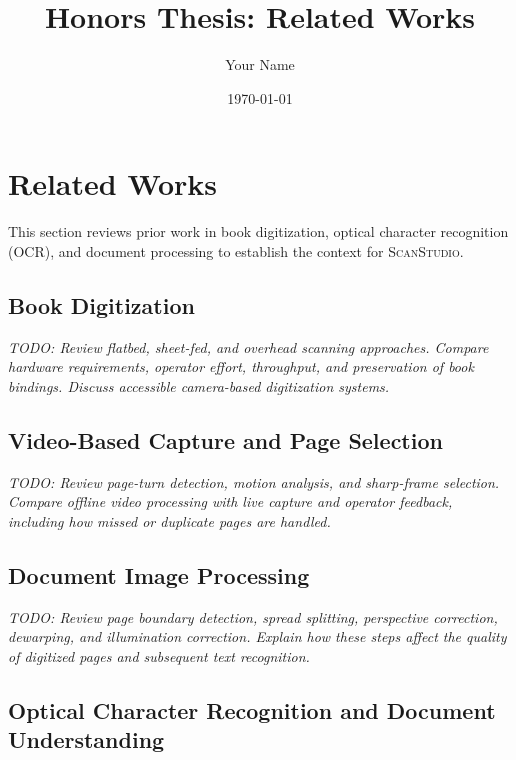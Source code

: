 \documentclass{article}
\title{Honors Thesis: Related Works}
\author{Your Name}
\date{\today}
\newcommand{\sys}{\textsc{ScanStudio}\xspace}
\begin{document}
\maketitle

\section{Related Works}
\label{sec:related-works}

This section reviews prior work in book digitization, optical character
recognition (OCR), and document processing to establish the context for \sys.


\subsection{Book Digitization}
\label{sec:rw-book-digitization}

\textit{TODO: Review flatbed, sheet-fed, and overhead scanning approaches.
Compare hardware requirements, operator effort, throughput, and preservation
of book bindings. Discuss accessible camera-based digitization systems.}

\subsection{Video-Based Capture and Page Selection}
\label{sec:rw-video-capture}

\textit{TODO: Review page-turn detection, motion analysis, and sharp-frame
selection. Compare offline video processing with live capture and operator
feedback, including how missed or duplicate pages are handled.}

\subsection{Document Image Processing}
\label{sec:rw-document-processing}

\textit{TODO: Review page boundary detection, spread splitting, perspective
correction, dewarping, and illumination correction. Explain how these steps
affect the quality of digitized pages and subsequent text recognition.}

\subsection{Optical Character Recognition and Document Understanding}
\label{sec:rw-ocr}
\end{document}
